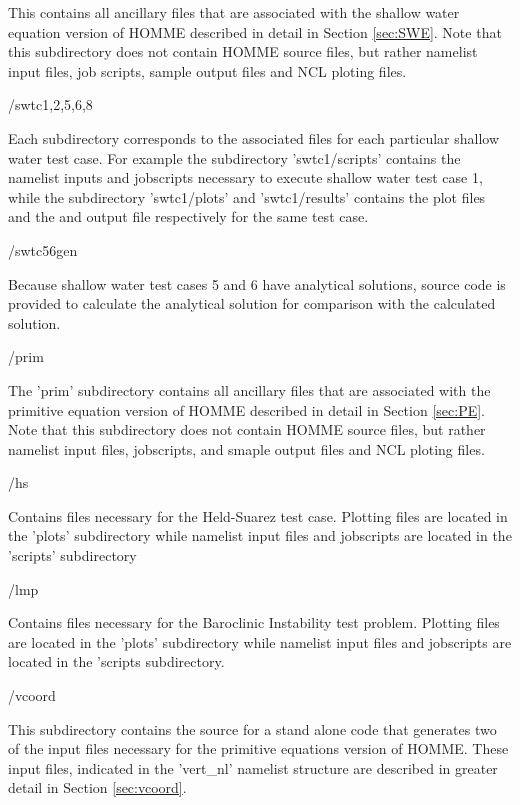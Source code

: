 \documentclass[12pt]{article}
\numberwithin{equation}{section}
\begin{document}
\begin{list}
			This contains all ancillary files that are associated with the shallow water equation version of HOMME described in detail in Section \ref{sec:SWE}.  Note that this subdirectory does not contain HOMME source files, but rather namelist input files, job scripts, sample output files and NCL ploting files. 

			\begin{list} {\setlength{\rightmargin}{\leftmargin}}
			\item /swtc{1,2,5,6,8}
		
			Each subdirectory corresponds to the associated files for each particular shallow water test case. For example the subdirectory 'swtc1/scripts' contains the namelist inputs and jobscripts necessary to execute shallow water test case 1, while the subdirectory 'swtc1/plots' and 'swtc1/results' contains the plot files and the and output file respectively for the same test case.  
		
			\item /swtc56gen
		
			Because shallow water test cases 5 and 6 have analytical solutions, source code is provided to calculate the analytical solution for comparison with the calculated solution.  
		
			\end{list}
		
		\item /prim
			
			The 'prim' subdirectory contains all ancillary files that are associated with the primitive equation version of HOMME described in detail in Section \ref{sec:PE}.  Note that this subdirectory does not contain HOMME source files, but rather namelist input files, jobscripts, and smaple output files and NCL ploting files.  
			
			\begin{list} {\setlength{\rightmargin}{\leftmargin}}
			\item /hs
				
					Contains files necessary for the Held-Suarez test case. Plotting files are located in the 'plots' subdirectory while namelist input files and jobscripts are located in the 'scripts' subdirectory 
			\item /lmp
					
					Contains files necessary for the Baroclinic Instability test problem.  Plotting files are located in the 'plots' subdirectory while namelist input files and jobscripts are located in the 'scripts subdirectory.  
					
			\item /vcoord
			
					This subdirectory contains the source for a stand alone code that generates two of the input files necessary for the primitive equations version of HOMME.   These input files, indicated in the 'vert\_nl' namelist structure are described in greater detail in Section \ref{sec:vcoord}.  
					
			\end{list}
		
\end{list}
\end{document}
